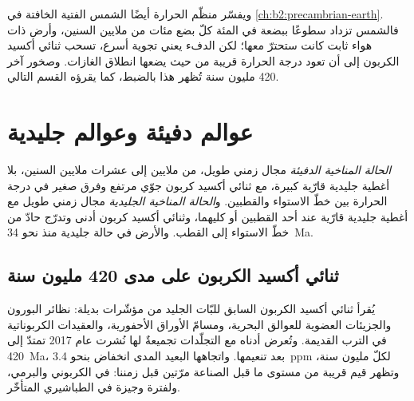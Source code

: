 ويفسّر منظّم الحرارة أيضًا الشمس الفتية الخافتة في \cref{ch:b2:precambrian-earth}. فالشمس تزداد سطوعًا
ببضعة في المئة كلّ بضع مئات من ملايين السنين، وأرض ذات هواء ثابت كانت ستحترّ معها؛
لكن الدفء يعني تجوية أسرع، تسحب ثنائي أكسيد الكربون إلى أن تعود درجة الحرارة
قريبة من حيث يضعها انطلاق الغازات. وصخور آخر 420 مليون سنة تُظهر هذا
بالضبط، كما يقرؤه القسم التالي.

\section{عوالم دفيئة وعوالم جليدية}\label{sec:b2:deep-time-climate:states}

\begin{definition}\label{def:b2:deep-time-climate:states}
\emph{الحالة المناخية الدفيئة} مجال زمني طويل، من ملايين إلى
عشرات ملايين السنين، بلا أغطية جليدية قارّية كبيرة، مع ثنائي أكسيد كربون جوّي مرتفع
وفرق صغير في درجة الحرارة بين خطّ الاستواء والقطبين. و\emph{الحالة المناخية
الجليدية} مجال زمني طويل مع أغطية جليدية قارّية عند أحد
القطبين أو كليهما، وثنائي أكسيد كربون أدنى وتدرّج حادّ من خطّ الاستواء إلى القطب. والأرض في
حالة جليدية منذ نحو \qty{34}{Ma}.
\end{definition}

\subsection*{ثنائي أكسيد الكربون على مدى 420 مليون سنة}

يُقرأ ثنائي أكسيد الكربون السابق للبّات الجليد من مؤشّرات بديلة: نظائر البورون والجزيئات العضوية
للعوالق البحرية، ومسامّ الأوراق الأحفورية، والعقيدات الكربوناتية في الترب القديمة. وتُعرض أدناه مع
التجلّدات تجميعةٌ لها نُشرت عام 2017 تمتدّ إلى \qty{420}{Ma}، بعد تنعيمها. واتجاهها
البعيد المدى انخفاض بنحو \qty{3.4}{ppm} لكلّ مليون سنة، وتظهر قيم قريبة من
مستوى ما قبل الصناعة مرّتين قبل زمننا: في الكربوني والبرمي،
ولفترة وجيزة في الطباشيري المتأخّر.

